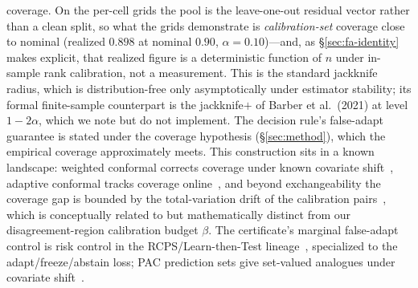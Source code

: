 coverage. On the per-cell grids the pool is the leave-one-out residual vector rather than a clean
split, so what the grids demonstrate is \emph{calibration-set} coverage close to nominal (realized
$0.898$ at nominal $0.90$, $\alpha{=}0.10$)---and, as \S\ref{sec:fa-identity} makes explicit, that
realized figure is a deterministic function of $n$ under in-sample rank calibration, not a
measurement. This is the standard jackknife radius, which is distribution-free only
asymptotically under estimator stability; its formal finite-sample counterpart is the jackknife$+$
of Barber et al.\ (2021) at level $1-2\alpha$, which we note but do not implement. The decision
rule's false-adapt guarantee is stated under the coverage hypothesis (\S\ref{sec:method}), which the
empirical coverage approximately meets. This construction sits in a known landscape: weighted conformal corrects
coverage under known covariate shift~\cite{tibshirani2019conformal}, adaptive conformal tracks
coverage online~\cite{gibbs2021adaptive}, and beyond exchangeability the coverage gap is bounded by
the total-variation drift of the calibration pairs~\cite{barber2023beyond}, which is conceptually
related to but mathematically distinct from our disagreement-region calibration budget $\beta$. The certificate's marginal false-adapt control is risk
control in the RCPS/Learn-then-Test lineage~\cite{bates2021rcps,angelopoulos2025ltt}, specialized
to the adapt/freeze/abstain loss; PAC prediction sets give set-valued analogues under covariate
shift~\cite{park2022pac}.

